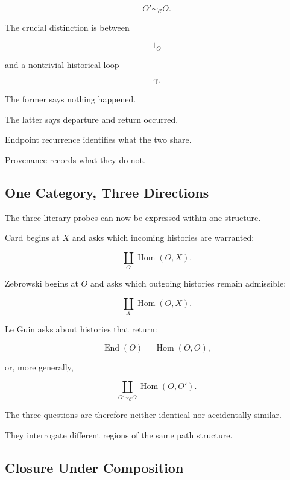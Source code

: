 \documentclass[
  11pt,
  a4paper,
  DIV=12,
  BCOR=0mm,
  parskip=half-
]{scrartcl}
\newcommand{\End}{\operatorname{End}}
\newcommand{\Hom}{\operatorname{Hom}}
\theoremstyle{definition}
\theoremstyle{plain}
\theoremstyle{remark}
\begin{document}
\[
  O'\sim_{\mathcal C}O.
\]

The crucial distinction is between

\[
  1_O
\]

and a nontrivial historical loop

\[
  \gamma.
\]

The former says nothing happened.

The latter says departure and return occurred.

Endpoint recurrence identifies what the two share.

Provenance records what they do not.


\subsection{One Category, Three Directions}
\label{app:three-hom-questions}

The three literary probes can now be expressed within one structure.

Card begins at \(X\) and asks which incoming histories are warranted:

\[
  \coprod_O\Hom(O,X).
\]

Zebrowski begins at \(O\) and asks which outgoing histories remain admissible:

\[
  \coprod_X\Hom(O,X).
\]

Le Guin asks about histories that return:

\[
  \End(O)
  =
  \Hom(O,O),
\]

or, more generally,

\[
  \coprod_{O'\sim_{\mathcal C}O}
  \Hom(O,O').
\]

The three questions are therefore neither identical nor accidentally similar.

They interrogate different regions of the same path structure.


\subsection{Closure Under Composition}
\label{app:admissible-category}
\end{document}
